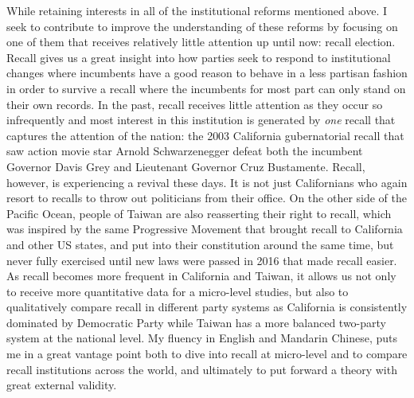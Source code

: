 \documentclass[hyphens, crop=false]{standalone}
\begin{document}
	While retaining interests in all of the institutional reforms mentioned above.
	I seek to contribute to improve
	the understanding of these reforms
	by focusing on one of them that receives relatively little attention
	up until now: recall election.
	Recall gives us a great insight into
	how parties seek to respond to institutional changes
	where incumbents have a good reason
	to behave in a less partisan fashion
	in order to survive a recall
	where the incumbents for most part
	can only stand on their own records.
	In the past,
	recall receives little attention as they occur so infrequently
	and most interest in this institution is generated by
	\textit{one} recall that captures the attention of the nation:
	the 2003 California gubernatorial recall
	that saw
	action movie star Arnold Schwarzenegger defeat
	both the incumbent Governor Davis Grey and Lieutenant Governor Cruz Bustamente.
	Recall, however,
	is experiencing a revival these days.
	It is not just Californians who again resort to recalls
	to throw out politicians from their office.
	On the other side of the Pacific Ocean,
	people of Taiwan are also reasserting their right to recall,
	which was inspired by the same Progressive Movement that brought recall to California and other US states,
	and put into their constitution around the same time,
	but never fully exercised until new laws were passed in 2016 that made recall easier.
	As recall becomes more frequent in California and Taiwan,
	it allows us not only to receive more quantitative data for a micro-level studies,
	but also to qualitatively compare recall in different party systems
	as California is consistently dominated by Democratic Party
	while Taiwan has a more balanced two-party system at the national level.
	My fluency in English and Mandarin Chinese,
	puts me in a great vantage point both to dive into recall at micro-level
	and to compare recall institutions across the world,
	and ultimately to put forward a theory with great external validity.
	
\end{document}
